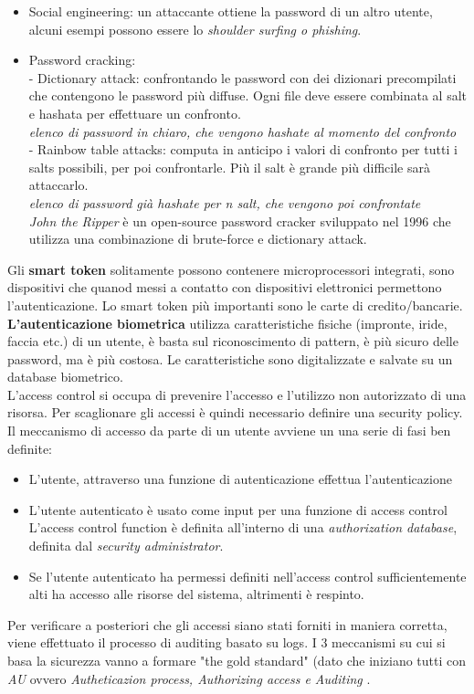 \documentclass[11pt, oneside]{article}   	%
\begin{document}
\begin{itemize}
\item Social engineering: un attaccante ottiene la password di un altro utente, alcuni esempi possono essere lo \emph{shoulder surfing o phishing}.
\item Password cracking: \\
- Dictionary attack: confrontando le password con dei dizionari precompilati che contengono le password più diffuse. Ogni file deve essere combinata al salt e hashata per effettuare un confronto.\\
\emph{elenco di password in chiaro, che vengono hashate al momento del confronto}\\
- Rainbow table attacks: computa in anticipo i valori di confronto per tutti i salts possibili, per poi confrontarle. Più il salt è grande più difficile sarà attaccarlo.\\
\emph{elenco di password già hashate per \emph{n salt}, che vengono poi confrontate}\\

 \emph{John the Ripper} è un open-source password cracker sviluppato nel 1996 che utilizza una combinazione di brute-force e dictionary attack.\\
 \end{itemize}
 Gli \textbf{smart token} solitamente possono contenere microprocessori integrati, sono dispositivi che quanod messi a contatto con dispositivi elettronici permettono l'autenticazione. Lo smart token più importanti sono le carte di credito/bancarie. \\
 \textbf{L'autenticazione biometrica} utilizza caratteristiche fisiche (impronte, iride, faccia etc.) di un utente, è basta sul riconoscimento di pattern, è più sicuro delle password, ma è più costosa. Le caratteristiche sono digitalizzate e salvate su un database biometrico.\\
 
L'access control si occupa di prevenire l'accesso e l'utilizzo non autorizzato di una risorsa.
Per scaglionare gli accessi è quindi necessario definire una security policy.\\
Il meccanismo di accesso da parte di un utente avviene un una serie di fasi ben definite:
\begin{itemize}
\item L'utente, attraverso una funzione di autenticazione effettua l'autenticazione
\item L'utente autenticato è usato come input per una funzione di access control\\
L'access control function è definita all'interno di una \emph{authorization database}, definita dal \emph{security administrator}.
\item Se l'utente autenticato ha permessi definiti nell'access control sufficientemente alti ha accesso alle risorse del sistema, altrimenti è respinto.
\end{itemize}
Per verificare a posteriori che gli accessi siano stati forniti in maniera corretta, viene effettuato il processo di auditing basato su logs.
I 3 meccanismi su cui si basa la sicurezza vanno a formare "the gold standard" (dato che iniziano tutti con \emph{AU} ovvero \emph{Autheticazion process, Authorizing access e Auditing} .
 
\end{document}
